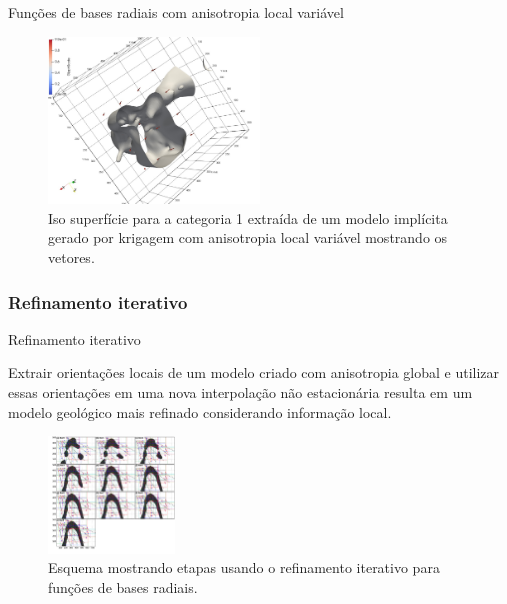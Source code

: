 \documentclass[aspectratio=169]{beamer}
\begin{document}
\begin{frame}{Funções de bases radiais com anisotropia local variável}
	\begin{figure}[H]
		\caption{\label{rbf_iterref}Iso superfície para a categoria 1 extraída de um modelo implícita gerado por krigagem com anisotropia local variável mostrando os vetores.}
		\begin{center}
			\includegraphics[width=0.5\textwidth]{capitulo_2/rbf_iterref.jpeg}
		\end{center}
	\end{figure}
\end{frame}

\subsubsection{Refinamento iterativo}

\begin{frame}{Refinamento iterativo}

Extrair orientações locais de um modelo criado com anisotropia global e utilizar essas orientações em uma nova interpolação não estacionária resulta em um modelo geológico mais refinado considerando informação local.

	\begin{figure}[H]
		\caption{\label{iterref} Esquema mostrando etapas usando o refinamento iterativo para funções de bases radiais.}
		\begin{center}
			\includegraphics[width=0.3\textwidth]{capitulo_2/iterref.jpg}
		\end{center}
	\end{figure}
\end{frame}
\end{document}
